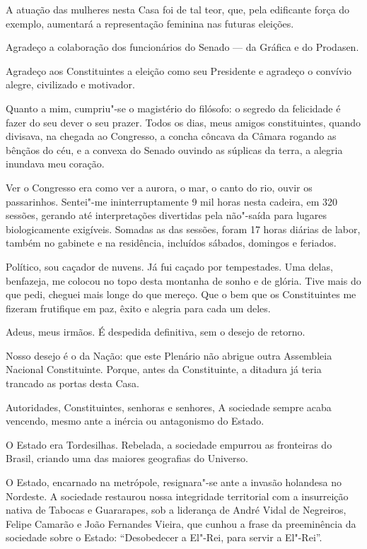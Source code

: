 A atuação das mulheres nesta Casa foi de tal teor, que, pela edificante
força do exemplo, aumentará a representação feminina nas futuras
eleições.

Agradeço a colaboração dos funcionários do Senado --- da Gráfica e do
Prodasen.

Agradeço aos Constituintes a eleição como seu Presidente e agradeço o
convívio alegre, civilizado e motivador.

Quanto a mim, cumpriu"-se o magistério do filósofo: o segredo da
felicidade é fazer do seu dever o seu prazer. Todos os dias, meus amigos
constituintes, quando divisava, na chegada ao Congresso, a concha
côncava da Câmara rogando as bênçãos do céu, e a convexa do Senado
ouvindo as súplicas da terra, a alegria inundava meu coração.

Ver o Congresso era como ver a aurora, o mar, o canto do rio, ouvir os
passarinhos. Sentei"-me ininterruptamente 9 mil horas nesta cadeira, em
320 sessões, gerando até interpretações divertidas pela não"-saída para
lugares biologicamente exigíveis. Somadas as das sessões, foram 17 horas
diárias de labor, também no gabinete e na residência, incluídos sábados,
domingos e feriados.

Político, sou caçador de nuvens. Já fui caçado por tempestades. Uma
delas, benfazeja, me colocou no topo desta montanha de sonho e de
glória. Tive mais do que pedi, cheguei mais longe do que mereço. Que o
bem que os Constituintes me fizeram frutifique em paz, êxito e alegria
para cada um deles.

Adeus, meus irmãos. É despedida definitiva, sem o desejo de retorno.

Nosso desejo é o da Nação: que este Plenário não abrigue outra
Assembleia Nacional Constituinte. Porque, antes da Constituinte, a
ditadura já teria trancado as portas desta Casa.

Autoridades, Constituintes, senhoras e senhores, A sociedade sempre
acaba vencendo, mesmo ante a inércia ou antagonismo do Estado.

O Estado era Tordesilhas. Rebelada, a sociedade empurrou as fronteiras
do Brasil, criando uma das maiores geografias do Universo.

O Estado, encarnado na metrópole, resignara"-se ante a invasão holandesa
no Nordeste. A sociedade restaurou nossa integridade territorial com a
insurreição nativa de Tabocas e Guararapes, sob a liderança de André
Vidal de Negreiros, Felipe Camarão e João Fernandes Vieira, que cunhou a
frase da preeminência da sociedade sobre o Estado: ``Desobedecer a
El"-Rei, para servir a El"-Rei''.

